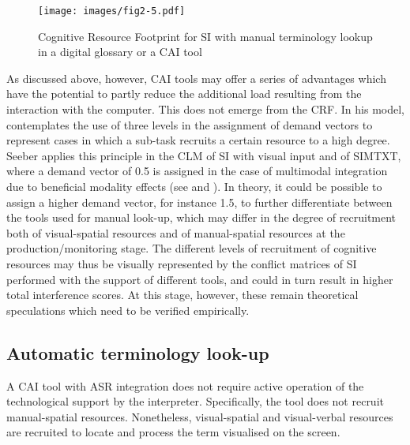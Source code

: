 \begin{figure}
\texttt{[image: images/fig2-5.pdf]}
\caption[Cognitive Resource Footprint for SI with manual terminology lookup]{Cognitive Resource Footprint for SI with manual terminology lookup in a digital glossary or a CAI tool \protect\citep[37]{prandi_exploratory_2018}}
\label{fig:CRFexp_b}
\end{figure}

As discussed above, however, CAI tools may offer a series of advantages which have the potential to partly reduce the additional load resulting from the interaction with the computer. This does not emerge from the CRF. In his model, \citet[172]{wickens_multiple_2002} contemplates the use of three levels in the assignment of demand vectors to represent cases in which a sub-task recruits a certain resource to a high degree. Seeber applies this principle in the CLM of SI with visual input and of SIMTXT, where a demand vector of 0.5 is assigned in the case of multimodal integration due to beneficial modality effects (see  and ). In theory, it could be possible to assign a higher demand vector, for instance 1.5, to further differentiate between the tools used for manual look-up, which may differ in the degree of recruitment both of visual-spatial resources and of manual-spatial resources at the production/monitoring stage. The different levels of recruitment of cognitive resources may thus be visually represented by the conflict matrices of SI performed with the support of different tools, and could in turn result in higher total interference scores. At this stage, however, these remain theoretical speculations which need to be verified empirically.
\subsection{Automatic terminology look-up} \label{automatic_query}
A CAI tool with ASR integration does not require active operation of the technological support by the interpreter. Specifically, the tool does not recruit manual-spatial resources. Nonetheless, visual-spatial and visual-verbal resources are recruited to locate and process the term visualised on the screen.

